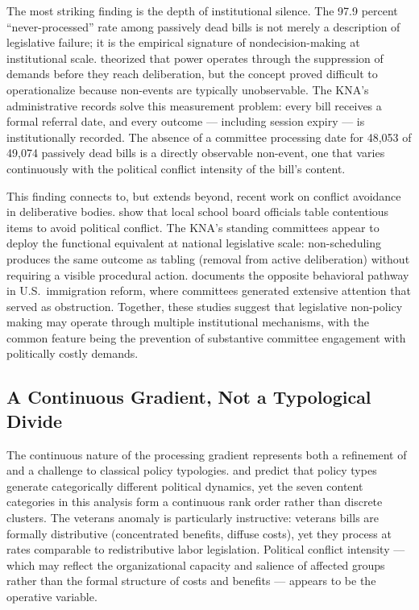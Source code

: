\documentclass[11pt]{article}
\begin{document}
The most striking finding is the depth of institutional silence. The 97.9 percent ``never-processed'' rate among passively dead bills is not merely a description of legislative failure; it is the empirical signature of nondecision-making at institutional scale. \citet{bachrach1962} theorized that power operates through the suppression of demands before they reach deliberation, but the concept proved difficult to operationalize because non-events are typically unobservable. The KNA's administrative records solve this measurement problem: every bill receives a formal referral date, and every outcome --- including session expiry --- is institutionally recorded. The absence of a committee processing date for 48,053 of 49,074 passively dead bills is a directly observable non-event, one that varies continuously with the political conflict intensity of the bill's content.

This finding connects to, but extends beyond, recent work on conflict avoidance in deliberative bodies. \citet{holman2025} show that local school board officials table contentious items to avoid political conflict. The KNA's standing committees appear to deploy the functional equivalent at national legislative scale: non-scheduling produces the same outcome as tabling (removal from active deliberation) without requiring a visible procedural action. \citet{fernandes2024} documents the opposite behavioral pathway in U.S.\ immigration reform, where committees generated extensive attention that served as obstruction. Together, these studies suggest that legislative non-policy making may operate through multiple institutional mechanisms, with the common feature being the prevention of substantive committee engagement with politically costly demands.

\subsection{A Continuous Gradient, Not a Typological Divide}

The continuous nature of the processing gradient represents both a refinement of and a challenge to classical policy typologies. \citet{lowi1964} and \citet{wilson1980} predict that policy types generate categorically different political dynamics, yet the seven content categories in this analysis form a continuous rank order rather than discrete clusters. The veterans anomaly is particularly instructive: veterans bills are formally distributive (concentrated benefits, diffuse costs), yet they process at rates comparable to redistributive labor legislation. Political conflict intensity --- which may reflect the organizational capacity and salience of affected groups rather than the formal structure of costs and benefits --- appears to be the operative variable.
\end{document}
